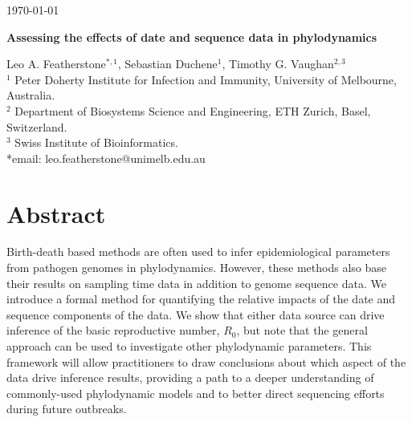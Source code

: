 \documentclass{article}
\begin{document}
\begin{flushright}
\today
\end{flushright}
\begin{center}
\begin{LARGE}
    \textbf{Assessing the effects of date and sequence data in phylodynamics}
\end{LARGE}
\end{center}
Leo A. Featherstone$^{\ast,1}$, Sebastian Duchene$^1$, Timothy G. Vaughan$^{2,3}$\\
$^{1}$ Peter Doherty Institute for Infection and Immunity, University of Melbourne, Australia.\\
$^{2}$ Department of Biosystems Science and Engineering, ETH Zurich, Basel, Switzerland.\\
$^{3}$  Swiss Institute of Bioinformatics.\\
*email: leo.featherstone@unimelb.edu.au
\section*{Abstract}
Birth-death based methods are often used to infer epidemiological parameters from pathogen genomes in phylodynamics.
However, these methods also base their results on sampling time data in addition to genome sequence data.
We introduce a formal method for quantifying the relative impacts of the date and sequence components of the data.
We show that either data source can drive inference of the basic reproductive number, $R_0$, but note that the general approach can be used to investigate other phylodynamic parameters. This framework will allow practitioners to draw conclusions about which aspect of the data drive inference results, providing a path to a deeper understanding of commonly-used phylodynamic models and to better direct sequencing efforts during future outbreaks.
\end{document}
